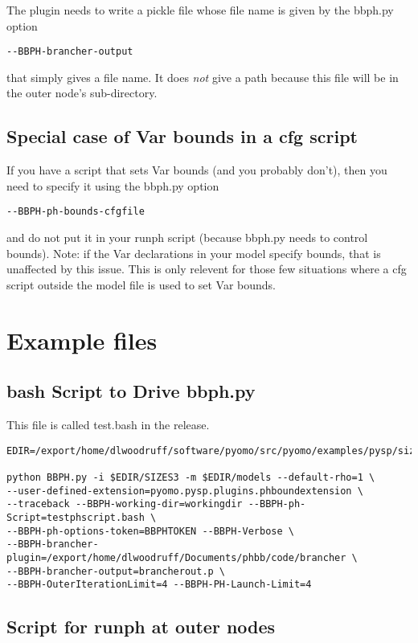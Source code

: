 \documentclass[12pt]{article}
\begin{document}
The plugin needs to write a pickle file whose file name
is given by the bbph.py option
\begin{verbatim}
--BBPH-brancher-output
\end{verbatim}
that simply gives a file name. It does {\em not} give
a path because this file will be in the
outer node's sub-directory.

\subsection{Special case of Var bounds in a cfg script}

If you have a script that sets Var bounds (and you probably don't), then you
need to specify it using the bbph.py option
\begin{verbatim}
--BBPH-ph-bounds-cfgfile
\end{verbatim}
and do not put it in your runph script (because bbph.py needs
to control bounds). Note: if the Var declarations in your
model specify bounds, that is unaffected by this issue. This
is only relevent for those few situations where a cfg script
outside the model file is used to set Var bounds.

\section{Example files}

\subsection{bash Script to Drive bbph.py}

This file is called test.bash in the release.

\begin{verbatim}
EDIR=/export/home/dlwoodruff/software/pyomo/src/pyomo/examples/pysp/sizes

python BBPH.py -i $EDIR/SIZES3 -m $EDIR/models --default-rho=1 \
--user-defined-extension=pyomo.pysp.plugins.phboundextension \
--traceback --BBPH-working-dir=workingdir --BBPH-ph-Script=testphscript.bash \
--BBPH-ph-options-token=BBPHTOKEN --BBPH-Verbose \
--BBPH-brancher-plugin=/export/home/dlwoodruff/Documents/phbb/code/brancher \
--BBPH-brancher-output=brancherout.p \
--BBPH-OuterIterationLimit=4 --BBPH-PH-Launch-Limit=4
\end{verbatim}

\subsection{Script for runph at outer nodes}
\end{document}
